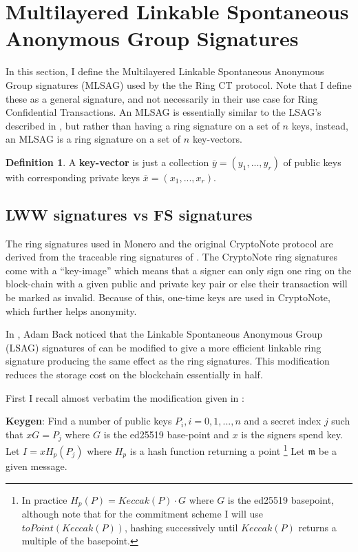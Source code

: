 \documentclass[12pt,english]{mrl}
\theoremstyle{definition}
\newtheorem{Defn}[lem]{Definition}
\newenvironment{defn}{\begin{Defn}\rm}{\end{Defn}}
\numberwithin{equation}{section}
\numberwithin{figure}{section}
\numberwithin{equation}{section}
\numberwithin{equation}{section}
\numberwithin{figure}{section}
\begin{document}
\section{Multilayered Linkable
Spontaneous Anonymous Group Signatures}
\label{MLSAGsection}



In this section, I define the Multilayered Linkable Spontaneous Anonymous 
Group signatures (MLSAG) used by the the Ring CT protocol. Note that
I define these as a general signature, and not necessarily in their
use case for Ring Confidential Transactions. An MLSAG is essentially similar to
the LSAG's described in \cite{LWW}, but rather than having a ring
signature on a set of $n$ keys, instead, an MLSAG is a ring signature
on a set of $n$ key-vectors. 
\begin{defn}
\label{def:A-key-vector-is}A \textbf{key-vector} is just a collection
$\overline{y}=\left(y_{1},...,y_{r}\right)$ of public keys with corresponding
private keys $\overline{x}=\left(x_{1},...,x_{r}\right)$. 
\end{defn}

\subsection{\label{sub:BackLSAG}LWW signatures vs FS signatures}

The ring signatures used in Monero and the original CryptoNote protocol are
derived from the traceable ring signatures of \cite{FS}. The CryptoNote \cite{CN}
ring signatures come with a ``key-image'' which means that a signer
can only sign one ring on the block-chain with a given public and
private key pair or else their transaction will be marked as invalid. Because of this, one-time keys are used in CryptoNote,
which further helps anonymity. 

In \cite{B}, Adam Back noticed that the Linkable Spontaneous Anonymous
Group (LSAG) signatures of \cite{LWW} can be modified to give a more efficient
linkable ring signature producing the same effect as the \cite{FS}
ring signatures. This modification reduces the storage cost on the
blockchain essentially in half.

First I recall almost verbatim the modification given in \cite{B}: 

\textbf{Keygen}: Find a number of public keys $P_{i},i=0,1,...,n$
and a secret index $j$ such that $xG=P_{j}$ where $G$ is the ed25519
base-point and $x$ is the signers spend key. Let $I=xH_p\left(P_{j}\right)$
where $H_p$ is a hash function returning a point \footnote{In practice $H_p(P) = Keccak(P)\cdot G$ where $G$ is the ed25519 basepoint, although note that for the commitment scheme I will use $toPoint(Keccak(P))$, hashing successively until $Keccak(P)$ returns a multiple of the basepoint.}
Let $\mathfrak{m}$ be a given message. 
\end{document}
